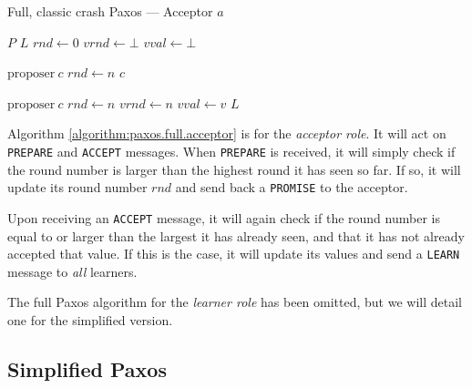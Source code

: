 \begin{algorithm}[H]
  \caption{Full, classic crash Paxos --- Acceptor $a$}
  \label{algorithm:paxos.full.acceptor}
  \begin{algorithmic}
    \State $P$ 
    \State $L$ 
    \State $rnd \gets 0$ 
    \State $vrnd \gets \bot$ 
    \State $vval \gets \bot$ 
    \State

       {$\text{proposer}\ c$} 
         \State $rnd \gets n$
         \State {}
                       {$c$}
      \EndIf
    \EndOn
    \State

       {$\text{proposer}\ c$} 
        \State $rnd \gets n$
        \State $vrnd \gets n$
        \State $vval \gets v$
        \State {}
                      {$L$}
      \EndIf
    \EndOn
  \end{algorithmic}
\end{algorithm}

Algorithm \ref{algorithm:paxos.full.acceptor}
 is for the \textit{acceptor
role}.  It will act on \texttt{PREPARE} and \texttt{ACCEPT} messages.
When \texttt{PREPARE} is received, it will simply check if the round number
is larger than the highest round it has seen so far.  If so, it will update
its round number $rnd$ and send back a \texttt{PROMISE} to the acceptor.

Upon receiving an \texttt{ACCEPT} message, it will again check if the round
number is equal to or larger than the largest it has already seen, and that
it has not already accepted that value.  If this is the case, it will update
its values and send a \texttt{LEARN} message to \textit{all} learners.

The full Paxos algorithm for the \textit{learner role} has been omitted, but
we will detail one for the simplified version.

\subsection{Simplified Paxos}
\label{ch:simplifying.paxos}

